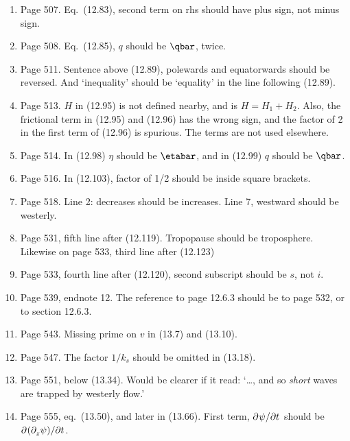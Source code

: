 \documentclass[10pt]{article}
\newcommand{\eq}{eq.\ } \newcommand{\Eq}{Eq.\ }
\begin{document}
\begin{enumerate}
\item Page 507. \Eq (12.83), second term on rhs should have plus sign, not minus sign.

\item Page 508. \Eq (12.85), $q$ should be $\qbar$, twice.

\item Page 511. Sentence above (12.89), polewards and equatorwards should be reversed. And `inequality' should be `equality' in the line following (12.89).

\item Page 513. $H$ in (12.95) is not defined nearby, and is $H = H_1 + H_2$. Also, the frictional term in (12.95) and (12.96) has the wrong sign, and the factor of 2 in the first term of (12.96) is spurious. The terms are not used elsewhere.

\item Page 514. In (12.98) $\eta$ should be $\etabar$, and in (12.99) $q$ should be $\qbar$.

\item Page 516. In (12.103), factor of 1/2 should be inside square brackets.

\item Page 518. Line 2: decreases should be increases. Line 7, westward should be westerly. 

\item Page 531, fifth line after (12.119). Tropopause should be troposphere. Likewise on page 533, third line after (12.123) 

\item Page 533, fourth line after (12.120), second subscript should be $s$, not $i$. 

\item Page 539, endnote 12. The reference to page 12.6.3 should be to page 532, or to section 12.6.3.

\item Page 543. Missing prime on $v$ in (13.7) and (13.10).
 
\item Page 547. The factor $1/k_s$ should be omitted in (13.18).

\item Page 551, below (13.34). Would be clearer if it read: `\ldots, and so \emph{short} waves are trapped by westerly flow.'

\item Page 555, \eq (13.50), and later in (13.66). First term, ${\partial^{} \psi / \partial t^{}}$ should be ${\partial^{}  ({\partial^{}_{z} \psi }) / \partial t^{}}$.  


\end{enumerate}
\end{document}
